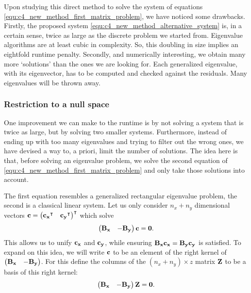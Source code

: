 Upon studying this direct method to solve the system of equations \eqref{equ:c4_new_method_first_matrix_problem}, we have noticed some drawbacks. Firstly, the proposed system \eqref{equ:c4_new_method_alternative_system} is, in a certain sense, twice as large as the discrete problem we started from. Eigenvalue algorithms are at least cubic in complexity. So, this doubling in size implies an eightfold runtime penalty. Secondly, and numerically interesting, we obtain many more `solutions' than the ones we are looking for. Each generalized eigenvalue, with its eigenvector, has to be computed and checked against the residuals. Many eigenvalues will be thrown away.

\subsubsection{Restriction to a null space}\label{sec:nm_by_restriction}

One improvement we can make to the runtime is by not solving a system that is twice as large, but by solving two smaller systems. Furthermore, instead of ending up with too many eigenvalues and trying to filter out the wrong ones, we have devised a way to, a priori, limit the number of solutions. The idea here is that, before solving an eigenvalue problem, we solve the second equation of \eqref{equ:c4_new_method_first_matrix_problem} and only take those solutions into account.

The first equation resembles a generalized rectangular eigenvalue problem, the second is a classical linear system. Let us only consider $n_x + n_y$ dimensional vectors $\vb{c} = {\begin{pmatrix}{\vb{c_x}}^\intercal & {\vb{c_y}}^\intercal \end{pmatrix}}^\intercal$ which solve
$$
    \begin{pmatrix}\vb{B_x} & -\vb{B_y} \end{pmatrix} \vb{c} = \vb{0}\text{.}
$$
This allows us to unify $\vb{c_x}$ and $\vb{c_y}$, while ensuring $\vb{B_x} \vb{c_x} = \vb{B_y} \vb{c_y}$ is satisfied. To expand on this idea, we will write $\vb{c}$ to be an element of the right kernel of  $\begin{pmatrix}\vb{B_x} & -\vb{B_y} \end{pmatrix}$. For this define the columns of the $(n_x + n_y) \times z$ matrix $\vb{Z}$ to be a basis of this right kernel:
\begin{equation}\label{equ:c4_null_space_kernel}
    \begin{pmatrix}\vb{B_x} & -\vb{B_y} \end{pmatrix} \vb{Z} = \vb{0}\text{.}
\end{equation}

